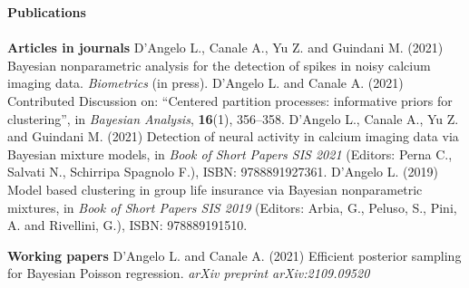 \documentclass[10pt]{amsart}
\begin{document}
	{\large {\bf Publications}} \\[-.08cm] 
		\underline{\hspace{6in}} \\[.2cm] 
	{\bf Articles in journals}  \newline
	D'Angelo L., Canale A., Yu Z. and Guindani M. (2021) Bayesian nonparametric analysis for the detection of spikes in noisy calcium imaging data. \textit{Biometrics} (in press). 
	\newline\newline
	D'Angelo L. and Canale A. (2021) Contributed Discussion on: ``Centered partition processes: informative priors for clustering'', in \textit{Bayesian Analysis}, \textbf{16}(1), 356--358.
	\newline\newline
	D'Angelo L., Canale A., Yu Z. and Guindani M. (2021) Detection of neural activity in calcium imaging data via Bayesian mixture models, in \textit{Book of Short Papers SIS 2021} (Editors: Perna C., Salvati N., Schirripa Spagnolo F.), ISBN: 9788891927361.
	\newline\newline
	D'Angelo L. (2019) Model based clustering in group life insurance via Bayesian nonparametric mixtures, in \textit{Book of Short Papers SIS 2019} (Editors: Arbia, G., Peluso, S., Pini, A. and Rivellini, G.), ISBN: 978889191510.
	\newline\newline
	

	 
	{\bf Working papers}  \newline
	D’Angelo L. and Canale A. (2021) Efficient posterior sampling for Bayesian Poisson regression. \textit{arXiv preprint arXiv:2109.09520}
	\newline\newline
	
\end{document}
